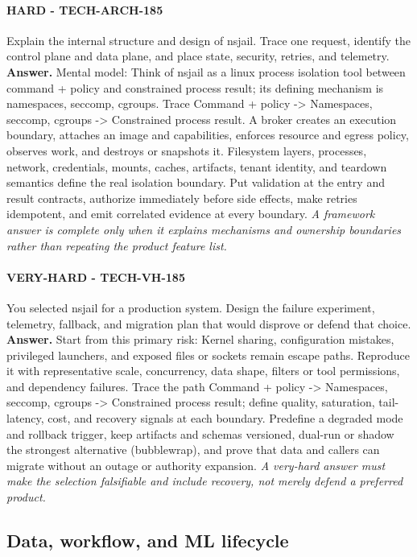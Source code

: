 \paragraph{HARD - TECH-ARCH-185} Explain the internal structure and design of nsjail. Trace one request, identify the control plane and data plane, and place state, security, retries, and telemetry.
\textbf{Answer.} Mental model: Think of nsjail as a linux process isolation tool between command + policy and constrained process result; its defining mechanism is namespaces, seccomp, cgroups. Trace Command + policy -> Namespaces, seccomp, cgroups -> Constrained process result. A broker creates an execution boundary, attaches an image and capabilities, enforces resource and egress policy, observes work, and destroys or snapshots it. Filesystem layers, processes, network, credentials, mounts, caches, artifacts, tenant identity, and teardown semantics define the real isolation boundary. Put validation at the entry and result contracts, authorize immediately before side effects, make retries idempotent, and emit correlated evidence at every boundary.
\textit{A framework answer is complete only when it explains mechanisms and ownership boundaries rather than repeating the product feature list.}
\paragraph{VERY-HARD - TECH-VH-185} You selected nsjail for a production system. Design the failure experiment, telemetry, fallback, and migration plan that would disprove or defend that choice.
\textbf{Answer.} Start from this primary risk: Kernel sharing, configuration mistakes, privileged launchers, and exposed files or sockets remain escape paths. Reproduce it with representative scale, concurrency, data shape, filters or tool permissions, and dependency failures. Trace the path Command + policy -> Namespaces, seccomp, cgroups -> Constrained process result; define quality, saturation, tail-latency, cost, and recovery signals at each boundary. Predefine a degraded mode and rollback trigger, keep artifacts and schemas versioned, dual-run or shadow the strongest alternative (bubblewrap), and prove that data and callers can migrate without an outage or authority expansion.
\textit{A very-hard answer must make the selection falsifiable and include recovery, not merely defend a preferred product.}
\subsection{Data, workflow, and ML lifecycle}
